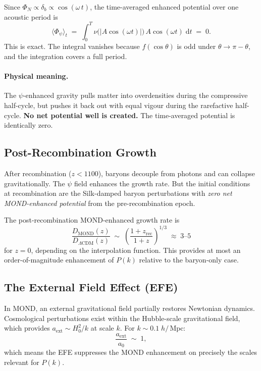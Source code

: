 \documentclass[12pt,a4paper]{article}
\newcommand{\Mpc}{\,\mathrm{Mpc}}
\newcommand{\LCDM}{\Lambda\mathrm{CDM}}
\newcommand{\azero}{a_0}
\begin{document}
Since $\Phi_N \propto \delta_b \propto \cos(\omega\,t)$, the
time-averaged enhanced potential over one acoustic period is
\begin{equation}
  \boxed{
  \bigl\langle \Phi_\psi \bigr\rangle_t
  \;=\; \int_0^{T} \nu\!\bigl(|A\cos(\omega t)|\bigr)\,
  A\cos(\omega t)\;\mathrm{d}t
  \;=\; 0.
  }
  \label{eq:odd_theorem}
\end{equation}
This is exact. The integral vanishes because $f(\cos\theta)$ is odd
under $\theta \to \pi - \theta$, and the integration covers a full
period.

\paragraph{Physical meaning.}
The $\psi$-enhanced gravity pulls matter into overdensities during the
compressive half-cycle, but pushes it back out with equal vigour during
the rarefactive half-cycle. \textbf{No net potential well is created.}
The time-averaged potential is identically zero.

\subsection{Post-Recombination Growth}

After recombination ($z < 1100$), baryons decouple from photons and can
collapse gravitationally. The $\psi$ field enhances the growth rate. But
the initial conditions at recombination are the Silk-damped baryon
perturbations with \emph{zero net MOND-enhanced potential} from the
pre-recombination epoch.

The post-recombination MOND-enhanced growth rate is
\begin{equation}
  \frac{D_{\mathrm{MOND}}(z)}{D_{\LCDM}(z)}
  \;\sim\; \left(\frac{1+z_{\mathrm{rec}}}{1+z}\right)^{1/3}
  \;\approx\; 3\text{--}5
\end{equation}
for $z = 0$, depending on the interpolation function. This provides at
most an order-of-magnitude enhancement of $P(k)$ relative to the
baryon-only case.

\subsection{The External Field Effect (EFE)}

In MOND, an external gravitational field partially restores Newtonian
dynamics. Cosmological perturbations exist within the Hubble-scale
gravitational field, which provides $a_{\mathrm{ext}} \sim H_0^2/k$
at scale $k$. For $k \sim 0.1\;h/\Mpc$:
\begin{equation}
  \frac{a_{\mathrm{ext}}}{\azero} \;\sim\; 1,
\end{equation}
which means the EFE suppresses the MOND enhancement on precisely the
scales relevant for $P(k)$.
\end{document}
